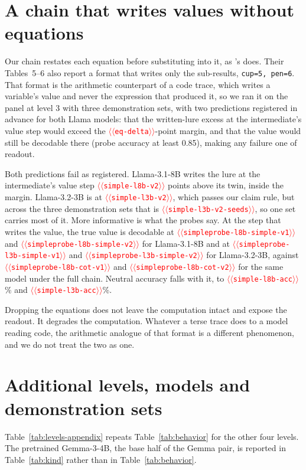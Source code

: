 \documentclass[11pt]{article}
\providecommand{\NUM}[1]{\textcolor{red}{$\langle\langle$\texttt{#1}$\rangle\rangle$}}
\begin{document}
\section{A chain that writes values without equations}
\label{app:simple}

Our chain restates each equation before substituting into it, as
\citeauthor{kudo2026faithful}'s does. Their Tables~5--6 also report a format that writes only the
sub-results, \texttt{cup=5, pen=6}. That format is the arithmetic counterpart of a code trace,
which writes a variable's value and never the expression that produced it, so we ran it on the
panel at level 3 with three demonstration sets, with two predictions registered in advance for both Llama models: that
the written-lure excess at the intermediate's value step would exceed the \NUM{eq-delta}-point
margin, and that the value would still be decodable there (probe accuracy at least 0.85), making
any failure one of readout.

Both predictions fail as registered. Llama-3.1-8B writes the lure at the intermediate's value
step \NUM{simple-l8b-v2} points above its twin, inside the margin. Llama-3.2-3B is at
\NUM{simple-l3b-v2}, which passes our claim rule, but across the three demonstration sets that
is \NUM{simple-l3b-v2-seeds}, so one set carries most of it. More informative is what the probes say. At
the step that writes the value, the true value is decodable at \NUM{simpleprobe-l8b-simple-v1}
and \NUM{simpleprobe-l8b-simple-v2} for Llama-3.1-8B and at
\NUM{simpleprobe-l3b-simple-v1} and \NUM{simpleprobe-l3b-simple-v2} for Llama-3.2-3B, against
\NUM{simpleprobe-l8b-cot-v1} and \NUM{simpleprobe-l8b-cot-v2} for the same model under the full
chain. Neutral accuracy falls with it, to \NUM{simple-l8b-acc}\% and \NUM{simple-l3b-acc}\%.

Dropping the equations does not leave the computation intact and expose the readout. It degrades
the computation. Whatever a terse trace does to a model reading code, the arithmetic analogue of
that format is a different phenomenon, and we do not treat the two as one.

\section{Additional levels, models and demonstration sets}
Table~\ref{tab:levels-appendix} repeats Table~\ref{tab:behavior} for the other four levels.
The pretrained Gemma-3-4B, the base half of the Gemma pair, is reported in
Table~\ref{tab:kind} rather than in Table~\ref{tab:behavior}.
\end{document}
